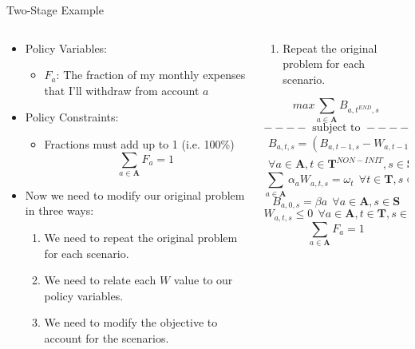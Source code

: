 \documentclass[10pt, aspectratio=169]{beamer}
\begin{document}
\begin{frame}{Two-Stage Example}
    \begin{columns}
        \begin{column}{0.5\textwidth}
            \begin{itemize}
                \item Policy Variables:
                \begin{itemize}
                    \item $F_a$: The fraction of my monthly expenses that I'll withdraw from account $a$
                \end{itemize}
                \item Policy Constraints:
                \begin{itemize}
                    \item Fractions must add up to 1 (i.e. 100\%)
                    $$\sum_{a \in \textbf{A}} F_a = 1$$
                \end{itemize}
                \item Now we need to modify our original problem in three ways:
                \begin{enumerate}
                    \item We need to repeat the original problem for each scenario.
                    \item We need to relate each $W$ value to our policy variables.
                    \item We need to modify the objective to account for the scenarios.
                \end{enumerate}
            \end{itemize}
        \end{column}
        \begin{column}{0.5\textwidth}
            \begin{enumerate}
                \item Repeat the original problem for each scenario.
            \end{enumerate}
            $$max \sum_{a \in \textbf{A}} B_{a,t^{END},s}$$
            $$----\text{ subject to }----$$
            \begin{equation}
                \begin{split}
                B_{a,t,s} = \left(B_{a,t-1,s}-W_{a,t-1,s}\right) \times (1 + \delta_{a,s}) \\ \forall a \in \textbf{A}, t \in \textbf{T}^{NON-INIT}, s \in \textbf{S}
                \end{split} \tag*{}
            \end{equation}
            $$\sum_{a \in \textbf{A}} \alpha_a W_{a,t,s} = \omega_t \ \ \forall t \in \textbf{T}, s \in \textbf{S}$$
            $$B_{a,0,s} = \beta{a} \ \ \forall a \in \textbf{A}, s \in \textbf{S}$$
            $$W_{a,t,s} \leq 0 \ \ \forall a \in \textbf{A}, t \in \textbf{T}, s \in \textbf{S}$$
            $$\sum_{a \in \textbf{A}} F_a = 1$$
        \end{column}
    \end{columns}
\end{frame}
\end{document}

